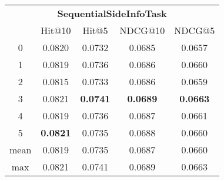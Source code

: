 \documentclass{article}
\begin{document}
 

\begin{tabular}{c|cccc}

\multicolumn{5}{c}{\textbf{SequentialSideInfoTask}} \\
\noalign{\smallskip}
\noalign{\smallskip}
\toprule
\multicolumn{1}{c}{Template ID} & \multicolumn{1}{|c}{Hit@10} & \multicolumn{1}{c}{Hit@5} & \multicolumn{1}{c}{NDCG@10} & \multicolumn{1}{c}{NDCG@5} \\
\midrule
0 & 0.0820 & 0.0732 & 0.0685 & 0.0657 \\
1 & 0.0819 & 0.0736 & 0.0686 & 0.0660 \\
2 & 0.0815 & 0.0733 & 0.0686 & 0.0659 \\
3 & 0.0821 & \textbf{0.0741} & \textbf{0.0689} & \textbf{0.0663} \\
4 & 0.0819 & 0.0736 & 0.0687 & 0.0661 \\
5 & \textbf{0.0821} & 0.0735 & 0.0688 & 0.0660 \\
\midrule
mean & 0.0819 & 0.0735 & 0.0687 & 0.0660 \\
max & 0.0821 & 0.0741 & 0.0689 & 0.0663 \\
\bottomrule

\end{tabular}
\end{document}
